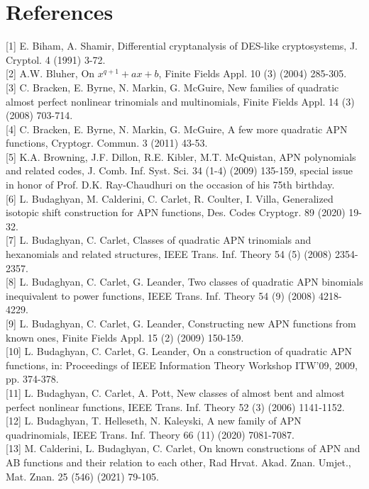 \documentclass[10pt]{article}
\begin{document}
\section*{References}
[1] E. Biham, A. Shamir, Differential cryptanalysis of DES-like cryptosystems, J. Cryptol. 4 (1991) 3-72.\\[0pt]
[2] A.W. Bluher, On $x^{q+1}+a x+b$, Finite Fields Appl. 10 (3) (2004) 285-305.\\[0pt]
[3] C. Bracken, E. Byrne, N. Markin, G. McGuire, New families of quadratic almost perfect nonlinear trinomials and multinomials, Finite Fields Appl. 14 (3) (2008) 703-714.\\[0pt]
[4] C. Bracken, E. Byrne, N. Markin, G. McGuire, A few more quadratic APN functions, Cryptogr. Commun. 3 (2011) 43-53.\\[0pt]
[5] K.A. Browning, J.F. Dillon, R.E. Kibler, M.T. McQuistan, APN polynomials and related codes, J. Comb. Inf. Syst. Sci. 34 (1-4) (2009) 135-159, special issue in honor of Prof. D.K. Ray-Chaudhuri on the occasion of his 75th birthday.\\[0pt]
[6] L. Budaghyan, M. Calderini, C. Carlet, R. Coulter, I. Villa, Generalized isotopic shift construction for APN functions, Des. Codes Cryptogr. 89 (2020) 19-32.\\[0pt]
[7] L. Budaghyan, C. Carlet, Classes of quadratic APN trinomials and hexanomials and related structures, IEEE Trans. Inf. Theory 54 (5) (2008) 2354-2357.\\[0pt]
[8] L. Budaghyan, C. Carlet, G. Leander, Two classes of quadratic APN binomials inequivalent to power functions, IEEE Trans. Inf. Theory 54 (9) (2008) 4218-4229.\\[0pt]
[9] L. Budaghyan, C. Carlet, G. Leander, Constructing new APN functions from known ones, Finite Fields Appl. 15 (2) (2009) 150-159.\\[0pt]
[10] L. Budaghyan, C. Carlet, G. Leander, On a construction of quadratic APN functions, in: Proceedings of IEEE Information Theory Workshop ITW'09, 2009, pp. 374-378.\\[0pt]
[11] L. Budaghyan, C. Carlet, A. Pott, New classes of almost bent and almost perfect nonlinear functions, IEEE Trans. Inf. Theory 52 (3) (2006) 1141-1152.\\[0pt]
[12] L. Budaghyan, T. Helleseth, N. Kaleyski, A new family of APN quadrinomials, IEEE Trans. Inf. Theory 66 (11) (2020) 7081-7087.\\[0pt]
[13] M. Calderini, L. Budaghyan, C. Carlet, On known constructions of APN and AB functions and their relation to each other, Rad Hrvat. Akad. Znan. Umjet., Mat. Znan. 25 (546) (2021) 79-105.\\[0pt]
\end{document}
